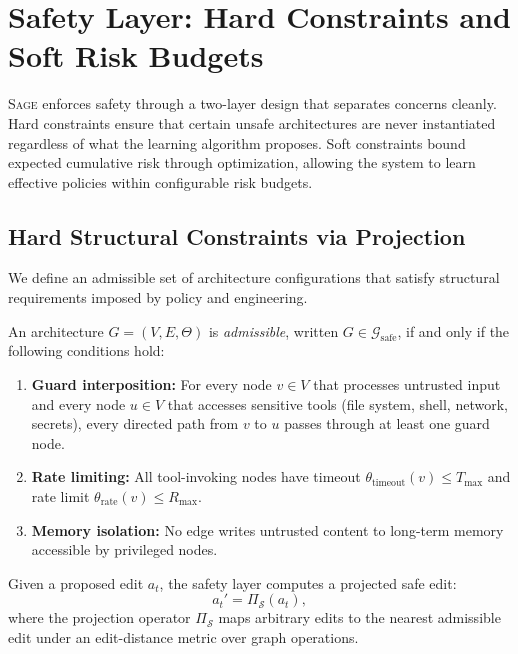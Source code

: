 \documentclass[sigconf,anonymous]{acmart}
\newcommand{\SAGE}{\textsc{Sage}\xspace}
\begin{document}
\section{Safety Layer: Hard Constraints and Soft Risk Budgets}
\label{sec:safety}

\SAGE enforces safety through a two-layer design that separates concerns cleanly. Hard constraints ensure that certain unsafe architectures are never instantiated regardless of what the learning algorithm proposes. Soft constraints bound expected cumulative risk through optimization, allowing the system to learn effective policies within configurable risk budgets.

\subsection{Hard Structural Constraints via Projection}

We define an admissible set of architecture configurations that satisfy structural requirements imposed by policy and engineering.

\begin{definition}
\label{def:admissible}
An architecture $G = (V, E, \Theta)$ is \emph{admissible}, written $G \in \mathcal{G}_{\text{safe}}$, if and only if the following conditions hold:
\begin{enumerate}
\item \textbf{Guard interposition:} For every node $v \in V$ that processes untrusted input and every node $u \in V$ that accesses sensitive tools (file system, shell, network, secrets), every directed path from $v$ to $u$ passes through at least one guard node.
\item \textbf{Rate limiting:} All tool-invoking nodes have timeout $\theta_{\text{timeout}}(v) \le T_{\max}$ and rate limit $\theta_{\text{rate}}(v) \le R_{\max}$.
\item \textbf{Memory isolation:} No edge writes untrusted content to long-term memory accessible by privileged nodes.
\end{enumerate}
\end{definition}

Given a proposed edit $a_t$, the safety layer computes a projected safe edit:
\begin{equation}
a_t' = \Pi_{\mathcal{S}}(a_t),
\end{equation}
where the projection operator $\Pi_{\mathcal{S}}$ maps arbitrary edits to the nearest admissible edit under an edit-distance metric over graph operations.
\end{document}
